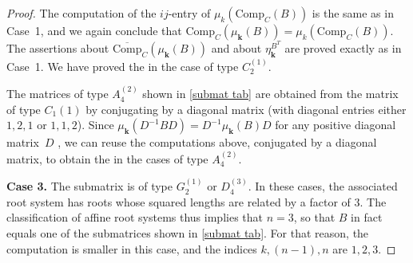 \documentclass{amsart}
\theoremstyle{definition}
\theoremstyle{remark}
\numberwithin{equation}{section}
\newcommand{\0}{{\mathbf{0}}}
\newcommand{\Comp}{\mathrm{Comp}_C}
\newcommand{\CompPlus}{\overline{\mathrm{Comp}}_C}
\newcommand{\kk}{\mathbf{k}}
\begin{document}
\begin{proof}
The computation of the $ij$-entry of $\mu_k(\Comp(B))$ is the same as in Case~1, and we again conclude that $\Comp(\mu_\kk(B))=\mu_k(\Comp(B))$.
The assertions about $\CompPlus(\mu_\kk(B))$ and about $\eta^{B^T}_\kk$ are proved exactly as in Case~1.
We have proved the  in the case of type $C_2^{(1)}$.

The matrices of type $A_4^{(2)}$ shown in \cref{submat tab} are obtained from the matrix of type $C_1{(1)}$ by conjugating by a diagonal matrix (with diagonal entries either $1,2,1$ or $1,1,2$).
Since $\mu_\kk(D^{-1}BD)=D^{-1}\mu_\kk(B)D$ for any positive diagonal matrix~$D$ \cite[Proposition~4.5]{ca1}, we can reuse the computations above, conjugated by a diagonal matrix, to obtain the  in the cases of type $A_4^{(2)}$.

\noindent
\textbf{Case 3.}
The submatrix is of type  $G_2^{(1)}$ or $D_4^{(3)}$.
In these cases, the associated root system has roots whose squared lengths are related by a factor of $3$.
The classification of affine root systems thus implies that $n=3$, so that $B$ in fact equals one of the submatrices shown in \cref{submat tab}.
For that reason, the computation is smaller in this case, and the indices $k,(n-1),n$ are $1,2,3$.


\end{proof}
\end{document}
